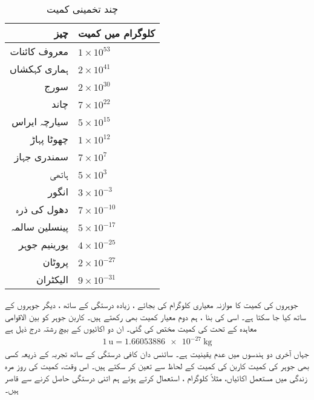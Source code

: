 \begin{table}[h!]
\caption{چند تخمینی کمیت}
\label{جدول_پیمائش_کمیت}
\centering
\begin{tabular}{rl}
\toprule
چیز & کلوگرام میں کمیت\\
\midrule
معروف کائنات & $1\times 10^{53}$\\
ہماری کہکشاں & $2\times 10^{41}$\\
سورج & $2\times 10^{30}$\\
چاند & $7\times 10^{22}$\\
سیارچہ ایراس& $5\times 10^{15}$\\
چھوٹا  پہاڑ & $1\times 10^{12}$\\
سمندری جہاز& $7\times10^{7}$\\
ہاتھی & $5\times10^{3}$\\
انگور & $3\times10^{-3}$\\
دھول کی ذرہ & $7\times10^{-10}$\\
پینسلین سالمہ & $5\times10^{-17}$\\
یورینیم جوہر & $4\times10^{-25}$\\
 پروٹان & $2\times10^{-27}$\\
 الیکٹران & $9\times10^{-31}$\\
 \bottomrule
\end{tabular}
\end{table}

جوہروں کی کمیت کا موازنہ معیاری کلوگرام کی بجائے ، زیادہ درستگی کے ساتھ ،  دیگر جوہروں کے ساتھ کیا جا سکتا ہے۔ اسی کی بنا ، ہم دوم معیار کمیت بھی رکھتے ہیں۔  کاربن  جوہر کو بین الاقوامی معاہدہ کے تحت    کی کمیت مختص کی گئی۔ ان دو اکائیوں کے بیچ رشتہ درج ذیل ہے
\begin{align}
\SI{1}{\atomicmassunit} = \SI{1.66053886e-27}{\kilogram}
\end{align}
جہاں آخری دو ہندسوں میں عدم یقینیت   ہے۔ سائنس دان کافی درستگی کے ساتھ تجربہ کے ذریعہ کسی بھی جوہر کی کمیت کاربن   کی کمیت کے لحاظ سے تعین کر سکتے ہیں۔ اس وقت،  کمیت کی روز مرہ زندگی میں مستعمل   اکائیاں، مثلاً کلوگرام ، استعمال کرتے ہوئے ہم اتنی درستگی حاصل کرنے سے قاصر ہیں۔

